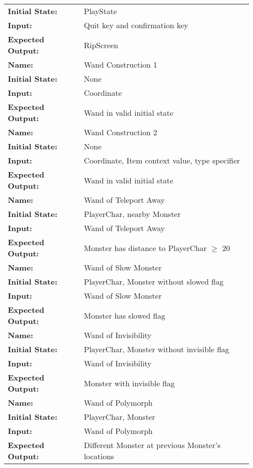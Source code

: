 \documentclass[12pt, titlepage]{article}
\begin{document}
\begin{center}
\begin{longtable}{ l | p{10cm} }
				\textbf{Initial State:} & PlayState\\
				\textbf{Input:} & Quit key and confirmation key\\
				\textbf{Expected Output:} & RipScreen\\[0.6em]
				\hline
				\rule{0pt}{1.5em}\textbf{Name:} & Wand Construction 1\\
				\textbf{Initial State:} & None\\
				\textbf{Input:} & Coordinate\\
				\textbf{Expected Output:} & Wand in valid initial state\\[0.6em]
				\hline
				\rule{0pt}{1.5em}\textbf{Name:} & Wand Construction 2\\
				\textbf{Initial State:} & None\\
				\textbf{Input:} & Coordinate, Item context value, type specifier\\
				\textbf{Expected Output:} & Wand in valid initial state\\[0.6em]
				\hline
				\rule{0pt}{1.5em}\textbf{Name:} & Wand of Teleport Away\\
				\textbf{Initial State:} & PlayerChar, nearby Monster\\
				\textbf{Input:} & Wand of Teleport Away\\
				\textbf{Expected Output:} & Monster has distance to PlayerChar $\ge$ 20\\[0.6em]
				\hline
				\rule{0pt}{1.5em}\textbf{Name:} & Wand of Slow Monster\\
				\textbf{Initial State:} & PlayerChar, Monster without slowed flag\\
				\textbf{Input:} & Wand of Slow Monster\\
				\textbf{Expected Output:} & Monster has slowed flag\\[0.6em]
				\hline
				\rule{0pt}{1.5em}\textbf{Name:} & Wand of Invisibility\\
				\textbf{Initial State:} & PlayerChar, Monster without invisible flag\\
				\textbf{Input:} & Wand of Invisibility\\
				\textbf{Expected Output:} & Monster with invisible flag\\[0.6em]
				\hline
				\rule{0pt}{1.5em}\textbf{Name:} & Wand of Polymorph\\
				\textbf{Initial State:} & PlayerChar, Monster\\
				\textbf{Input:} & Wand of Polymorph\\
				\textbf{Expected Output:} & Different Monster at previous Monster's locations\\[0.6em]

\end{longtable}
\end{center}
\end{document}
